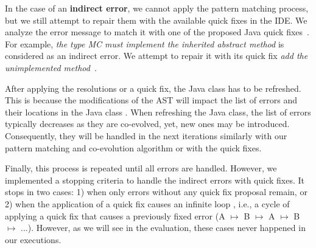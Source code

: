 	In the case of an \textbf{indirect error}, we cannot apply the pattern matching process, but we still attempt to repair them with the available quick fixes in the IDE. 
	We analyze the error message to match it with one of the proposed Java quick fixes~{\small{}}. For example, \emph{the type MC must implement the inherited abstract method} is considered as an indirect error. 
	We attempt to repair it with its quick fix \emph{add the unimplemented method}~{\small{}}.
	
	After applying the resolutions or a quick fix, the Java class has to be refreshed. This is because the modifications of the AST will impact the list of errors and their locations in the Java class {\small{}}. When 
	refreshing the Java class, the list of errors typically decreases as they are co-evolved,  
	yet, new ones may be introduced. Consequently, they will be handled in the next iterations similarly with our pattern matching and co-evolution algorithm or with the quick fixes.
	
	Finally, this process is repeated until all errors are handled. 
	However, we implemented a stopping criteria to handle the indirect errors with quick fixes. 
	It stops in two cases: 1) when only errors without any quick fix proposal remain, or 2) when the application of a quick fix causes an infinite loop \cite{cuadrado2018quick,khelladi2019detecting}, i.e., a cycle of applying a quick fix that causes a previously fixed error (A $\mapsto$ B $\mapsto$ A $\mapsto$ B $\mapsto$ ...). However, as we will see in the evaluation, these cases never happened in our executions. 
	
